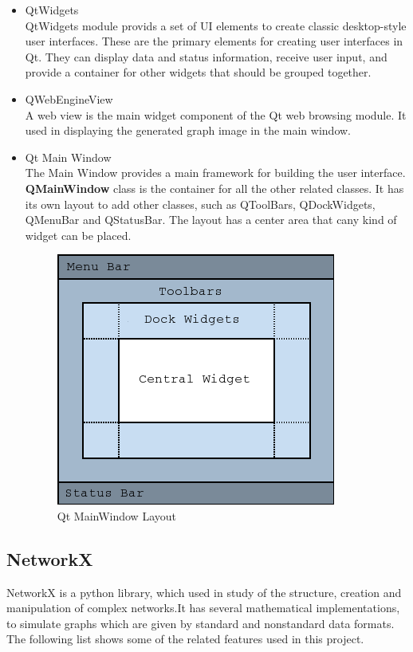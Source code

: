 \documentclass[11pt]{article}
\begin{document}
\begin{itemize}
	\item QtWidgets \\
	QtWidgets module provids a set of UI elements to create classic desktop-style user interfaces. These are the primary elements for creating user interfaces in Qt. They can display data and status information, receive user input, and provide a container for other widgets that should be grouped together. 
	\item QWebEngineView \\
	A web view is the main widget component of the Qt web browsing module. It used in displaying the generated graph image in the main window.
	\item Qt Main Window \\
	The Main Window provides a main framework for building the user interface. \textbf{QMainWindow} class is the container for all the other related classes. It has its own layout to add other classes, such as QToolBars, QDockWidgets, QMenuBar and QStatusBar. The layout has a center area that cany kind of widget can be placed. 
\begin{figure}[ht]
\centering
     \includegraphics[scale=0.8]{mainwindowlayout.png}
      \caption{Qt MainWindow Layout}
       \label{normal_case}
\end{figure}
\end{itemize}
\pagebreak 
\subsection{NetworkX}

NetworkX is a python library, which used in study of the structure, creation and manipulation of complex networks.It has several mathematical implementations, to simulate graphs which are given by standard and nonstandard data formats. The following list shows some of the related features used in this project.
\end{document}
